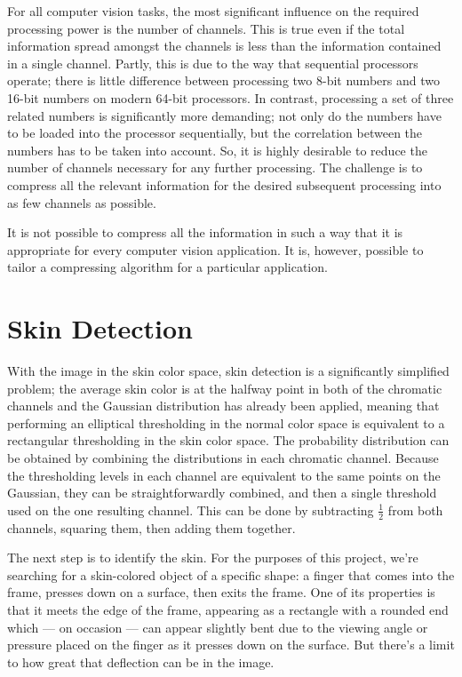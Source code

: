 For all computer vision tasks, the most significant influence on the required processing power is the number of channels. This is true even if the total information spread amongst the channels is less than the information contained in a single channel. Partly, this is due to the way that sequential processors operate; there is little difference between processing two 8-bit numbers and two 16-bit numbers on modern 64-bit processors. In contrast, processing a set of three related numbers is significantly more demanding; not only do the numbers have to be loaded into the processor sequentially, but the correlation between the numbers has to be taken into account. So, it is highly desirable to reduce the number of channels necessary for any further processing. The challenge is to compress all the relevant information for the desired subsequent processing into as few channels as possible.

It is not possible to compress all the information in such a way that it is appropriate for every computer vision application. It is, however, possible to tailor a compressing algorithm for a particular application.


\section{Skin Detection}\label{sec:SkinDetection}

With the image in the skin color space, skin detection is a significantly simplified problem; the average skin color is at the halfway point in both of the chromatic channels and the Gaussian distribution has already been applied, meaning that performing an elliptical thresholding in the normal color space is equivalent to a rectangular thresholding in the skin color space. The probability distribution can be obtained by combining the distributions in each chromatic channel. Because the thresholding levels in each channel are equivalent to the same points on the Gaussian, they can be straightforwardly combined, and then a single threshold used on the one resulting channel. This can be done by subtracting $\frac{1}{2}$ from both channels, squaring them, then adding them together.

The next step is to identify the skin. For the purposes of this project, we're searching for a skin-colored object of a specific shape: a finger that comes into the frame, presses down on a surface, then exits the frame. One of its properties is that it meets the edge of the frame, appearing as a rectangle with a rounded end which --- on occasion --- can appear slightly bent due to the viewing angle or pressure placed on the finger as it presses down on the surface. But there's a limit to how great that deflection can be in the image.

